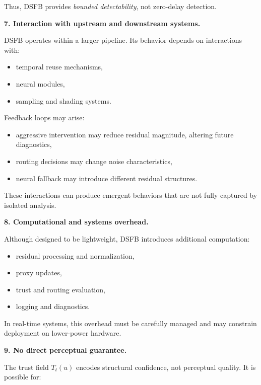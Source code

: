 \documentclass[11pt]{article}
\theoremstyle{definition}
\theoremstyle{plain}
\begin{document}
Thus, DSFB provides \emph{bounded detectability}, not zero-delay detection.

\vspace{0.5em}
\noindent
\textbf{7. Interaction with upstream and downstream systems.}

DSFB operates within a larger pipeline. Its behavior depends on interactions with:

\begin{itemize}[leftmargin=1.5em]
    \item temporal reuse mechanisms,
    \item neural modules,
    \item sampling and shading systems.
\end{itemize}

Feedback loops may arise:

\begin{itemize}[leftmargin=1.5em]
    \item aggressive intervention may reduce residual magnitude, altering future diagnostics,
    \item routing decisions may change noise characteristics,
    \item neural fallback may introduce different residual structures.
\end{itemize}

These interactions can produce emergent behaviors that are not fully captured by isolated analysis.

\vspace{0.5em}
\noindent
\textbf{8. Computational and systems overhead.}

Although designed to be lightweight, DSFB introduces additional computation:

\begin{itemize}[leftmargin=1.5em]
    \item residual processing and normalization,
    \item proxy updates,
    \item trust and routing evaluation,
    \item logging and diagnostics.
\end{itemize}

In real-time systems, this overhead must be carefully managed and may constrain deployment on lower-power hardware.

\vspace{0.5em}
\noindent
\textbf{9. No direct perceptual guarantee.}

The trust field $T_t(u)$ encodes structural confidence, not perceptual quality. It is possible for:
\end{document}
